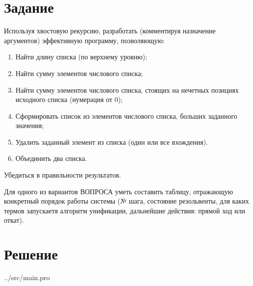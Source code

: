 \section*{Задание}

Используя хвостовую рекурсию, разработать (комментируя назначение аргументов) эффективную программу, позволяющую:
\begin{enumerate}
	\item Найти длину списка (по верхнему уровню);
	\item Найти сумму элементов числового списка;
	\item Найти сумму элементов числового списка, стоящих на нечетных позициях исходного
списка (нумерация от 0);
	\item Сформировать список из элементов числового списка, больших заданного значения;
	\item Удалить заданный элемент из списка (один или все вхождения).
	\item Объединить два списка.
 \end{enumerate}

Убедиться в правильности результатов.

Для одного из вариантов ВОПРОСА уметь составить таблицу, отражающую конкретный
порядок работы системы (№ шага, состояние резольвенты, для каких термов запускаетя алгоритм унификации, дальнейшие действия: прямой ход или откат).

\clearpage

\section*{Решение}

\begin{lstinputlisting}[
	caption={Листинг программы},
	label={lst:t1},
	linerange={1-64},
	]{../src/main.pro}
\end{lstinputlisting}

